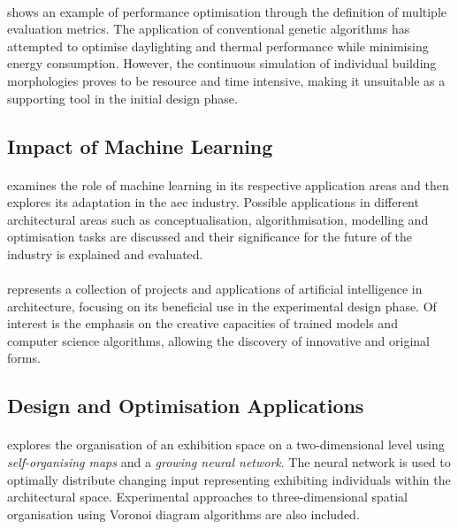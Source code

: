 \documentclass[a4paper, 12pt]{report}
\begin{document}
\paragraph{\cite{aksin2021use}} shows an example of performance optimisation through the definition of multiple evaluation metrics. The application of conventional genetic algorithms has attempted to optimise daylighting and thermal performance while minimising energy consumption. However, the continuous simulation of individual building morphologies proves to be resource and time intensive, making it unsuitable as a supporting tool in the initial design phase.

\subsection*{Impact of Machine Learning}\label{subsec:impact-of-machine-learning-fr}

\paragraph{\cite{belem2019impact}} examines the role of machine learning in its respective application areas and then explores its adaptation in the \acrshort{aec} industry. Possible applications in different architectural areas such as conceptualisation, algorithmisation, modelling and optimisation tasks are discussed and their significance for the future of the industry is explained and evaluated.

\paragraph{\cite{pena2021artificial}} represents a collection of projects and applications of artificial intelligence in architecture, focusing on its beneficial use in the experimental design phase. Of interest is the emphasis on the creative capacities of trained models and computer science algorithms, allowing the discovery of innovative and original forms.

\subsection*{Design and Optimisation Applications}\label{subsec:design-and-optimisation-applications-fr}

\paragraph{\cite{harding2011associative}} explores the organisation of an exhibition space on a two-dimensional level using \textit{self-organising maps} and a \textit{growing neural network}. The neural network is used to optimally distribute changing input representing exhibiting individuals within the architectural space. Experimental approaches to three-dimensional spatial organisation using Voronoi diagram algorithms are also included.
\end{document}
